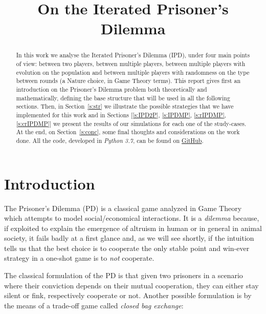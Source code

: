 \documentclass[journal,a4paper,10pt,twoside]{IEEEtran} %
\begin{document}
\title{On the Iterated Prisoner's Dilemma}

\author{%

}

\maketitle

\begin{abstract}
In this work we analyse the Iterated Prisoner's Dilemma (IPD), under four main points of view: between two players, between multiple players, between multiple players with evolution on the population and between multiple players with randomness on the type between rounds (a Nature choice, in Game Theory terms).
This report gives first an introduction on the Prisoner's Dilemma problem both theoretically and mathematically, defining the base structure that will be used in all the following sections.
Then, in Section~\ref{s:str} we illustrate the possible strategies that we have implemented for this work and in Sections [\ref{s:IPD2P}, \ref{s:IPDMP}, \ref{s:rIPDMP}, \ref{s:crIPDMP}] we present the results of our simulations for each one of the study-cases.
At the end, on Section~\ref{s:conc}, some final thoughts and considerations on the work done.
All the code, developed in \textit{Python 3.7}, can be found on \href{https://github.com/eliabntt/LaboratoryOfComputationalPhysics/tree/Group9}{GitHub}.
\end{abstract}

\section{Introduction} 
The Prisoner's Dilemma (PD) is a classical game analyzed in Game Theory which attempts to model social/economical interactions. It is a \textit{dilemma} because, if exploited to explain the emergence of altruism in human or in general in animal society, it fails badly at a first glance and, as we will see shortly, if the intuition tells us that the best choice is to cooperate the only stable point and win-ever strategy in a one-shot game is to \textit{not} cooperate.

The classical formulation of the PD is that given two prisoners in a scenario where their conviction depends on their mutual cooperation, they can either stay silent or fink, respectively cooperate or not. 
Another possible formulation is by the means of a trade-off game called \textit{closed bag exchange}:
\end{document}
